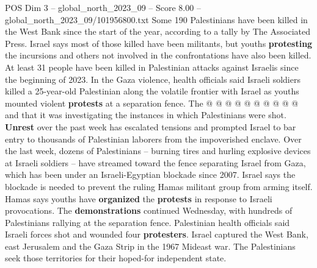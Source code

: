 \begin{textsample}{POS Dim 3 – global\_north\_2023\_09 – Score 8.00 – global\_north\_2023\_09/101956800.txt}
Some 190 Palestinians have been killed in the West Bank since the start of the year, according to a tally by The Associated Press.
Israel says most of those killed have been militants, but youths \textbf{protesting} the incursions and others not involved in the confrontations have also been killed.
At least 31 people have been killed in Palestinian attacks against Israelis since the beginning of 2023.
In the Gaza violence, health officials said Israeli soldiers killed a 25-year-old Palestinian along the volatile frontier with Israel as youths mounted violent \textbf{protests} at a separation fence.
The @ @ @ @ @ @ @ @ @ @ and that it was investigating the instances in which Palestinians were shot. \textbf{Unrest} over the past week has escalated tensions and prompted Israel to bar entry to thousands of Palestinian laborers from the impoverished enclave.
Over the last week, dozens of Palestinians -- burning tires and hurling explosive devices at Israeli soldiers -- have streamed toward the fence separating Israel from Gaza, which has been under an Israeli-Egyptian blockade since 2007.
Israel says the blockade is needed to prevent the ruling Hamas militant group from arming itself.
Hamas says youths have \textbf{organized} the \textbf{protests} in response to Israeli provocations.
The \textbf{demonstrations} continued Wednesday, with hundreds of Palestinians rallying at the separation fence.
Palestinian health officials said Israeli forces shot and wounded four \textbf{protesters}.
Israel captured the West Bank, east Jerusalem and the Gaza Strip in the 1967 Mideast war.
The Palestinians seek those territories for their hoped-for independent state.

\end{textsample}
